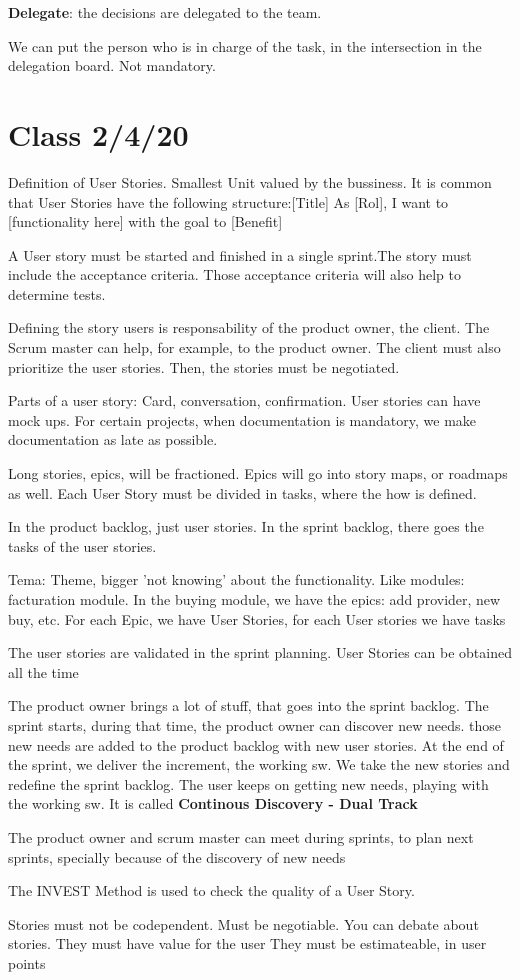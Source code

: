 \documentclass[a4paper,12pt]{article}
\begin{document}
\textbf{Delegate}: the decisions are delegated to the team.

We can put the person who is in charge of the task, in the intersection in the delegation board. Not mandatory.

\section{Class 2/4/20}

Definition of User Stories.
Smallest Unit valued by the bussiness.
It is common that User Stories have the following structure:[Title] As [Rol], I want to [functionality here] with the goal to [Benefit]

A User story must be started and finished in a single sprint.The story must include the acceptance criteria. Those acceptance criteria will also help to determine tests.

Defining the story users is responsability of the product owner, the client. The Scrum master can help, for example, to the product owner. The client must also prioritize the user stories. Then, the stories must be negotiated.

Parts of a user story: Card, conversation, confirmation. User stories can have mock ups. For certain projects, when documentation is mandatory, we make documentation as late as possible. 

Long stories, epics, will be fractioned. Epics will go into story maps, or roadmaps as well. Each User Story must be divided in tasks, where the how is defined.

In the product backlog, just user stories. In the sprint backlog, there goes the tasks of the user stories.

Tema: Theme, bigger 'not knowing' about the functionality. Like modules: facturation module. In the buying module, we have the epics: add provider, new buy, etc. For each Epic, we have User Stories, for each User stories we have tasks

The user stories are validated in the sprint planning. User Stories can be obtained all the time

The product owner brings a lot of stuff, that goes into the sprint backlog. The sprint starts, during that time, the product owner can discover new needs. those new needs are added to the product backlog with new user stories. At the end of the sprint, we deliver the increment, the working sw. We take the new stories and redefine the sprint backlog. The user keeps on getting new needs, playing with the working sw. It is called \textbf{Continous Discovery - Dual Track}

The product owner and scrum master can meet during sprints, to plan next sprints, specially because of the discovery of new needs

The INVEST Method is used to check the quality of a User Story.

Stories must not be codependent.
Must be negotiable. You can debate about stories.
They must have value for the user
They must be estimateable, in user points 
\end{document}
